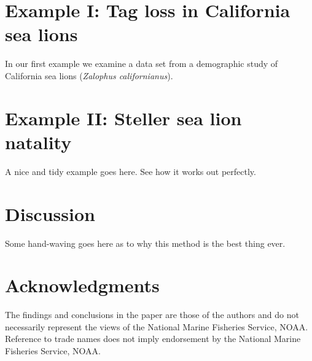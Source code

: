 \documentclass[fleqn]{article}
\begin{document}
\section{Example I: Tag loss in California sea lions}

In our first example we examine a data set from a demographic study of California sea lions ({\it Zalophus californianus}). 

\section{Example II: Steller sea lion natality}

A nice and tidy example goes here. See how it works out perfectly.

\section{Discussion}

Some hand-waving goes here as to why this method is the best thing ever.


\section*{Acknowledgments}
The findings and conclusions in the paper are those of the authors and do not necessarily represent the views of the National Marine Fisheries Service, NOAA. Reference to trade names does not imply endorsement by the National Marine Fisheries Service, NOAA.

\renewcommand{\baselinestretch}{1}\normalsize



\clearpage


\renewcommand{\arraystretch}{1.33}
\end{document}

